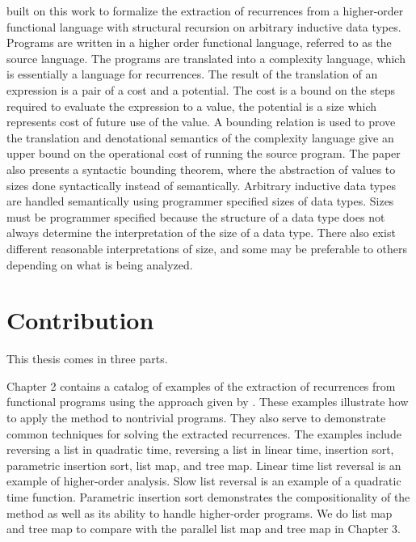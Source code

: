 \citet{Danner2015} built on this work to formalize the extraction
of recurrences from a higher-order functional language with structural
recursion on arbitrary inductive data types. Programs are written in a higher
order functional language, referred to as the source language. The programs are
translated into a complexity language, which is essentially a language for
recurrences.  The result of the translation of an expression is a pair of a
cost and a potential. The cost is a bound on the steps required to evaluate the
expression to a value, the potential is a size which represents cost of future
use of the value. A bounding relation is used to prove the translation and
denotational semantics of the complexity language give an upper bound on the
operational cost of running the source program. The paper also presents a
syntactic bounding theorem, where the abstraction of values to sizes done
syntactically instead of semantically.  Arbitrary inductive data types are
handled semantically using programmer specified sizes of data types. Sizes must
be programmer specified because the structure of a data type does not always
determine the interpretation of the size of a data type. There also exist
different reasonable interpretations of size, and some may be preferable to
others depending on what is being analyzed.


\section{Contribution}

This thesis comes in three parts.



Chapter 2 contains a catalog of examples of the extraction of recurrences
from functional programs using the approach given by \citet{Danner2015}. These
examples illustrate how to apply the method to nontrivial programs. They also
serve to demonstrate common techniques for solving the extracted recurrences.
The examples include reversing a list in quadratic time, reversing a list in
linear time, insertion sort, parametric insertion sort, list map, and tree map.
Linear time list reversal is an example of higher-order analysis. Slow list
reversal is an example of a quadratic time function. Parametric insertion sort
demonstrates the compositionality of the method as well as its ability to
handle higher-order programs.  We do list map and tree map to compare with the
parallel list map and tree map in Chapter 3.




